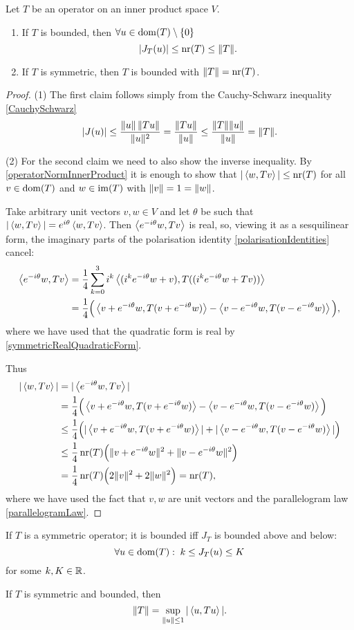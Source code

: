 \begin{proposition} \label{normNumRadius}
Let $T$ be an operator on an inner product space $V$.
\begin{enumerate}
\item If $T$ is bounded, then $\forall u\in \operatorname{dom}(T)\setminus\{0\}$
\[ |J_T(u)| \leq \operatorname{nr}(T) \leq \lVert T\rVert. \]
\item If $T$ is symmetric, then $T$ is bounded with $\lVert T\rVert = \operatorname{nr}(T)$.
\end{enumerate}
\end{proposition}
\begin{proof}
(1) The first claim follows simply from the Cauchy-Schwarz inequality \ref{CauchySchwarz}
\[ |J(u)| \leq \frac{\lVert u\rVert\,\lVert Tu\rVert}{\lVert u\rVert^2} = \frac{\lVert Tu\rVert}{\lVert u\rVert} \leq \frac{\lVert T\rVert\lVert u\rVert}{\lVert u\rVert} = \lVert T\rVert. \]

(2) For the second claim we need to also show the inverse inequality. By \ref{operatorNormInnerProduct} it is enough to show that $|\left\langle w,Tv \right\rangle| \leq \operatorname{nr}(T)$ for all $v\in \operatorname{dom}(T)$ and $w\in\operatorname{im}(T)$ with $\lVert v\rVert = 1 = \lVert w\rVert$.

Take arbitrary unit vectors $v,w\in V$ and let $\theta$ be such that $|\left\langle w,Tv \right\rangle| = e^{i\theta}\left\langle w,Tv \right\rangle$. Then $\left\langle e^{-i\theta}w,Tv \right\rangle$ is real, so, viewing it as a sesquilinear form, the imaginary parts of the polarisation identity \ref{polarisationIdentities} cancel:
\begin{align*}
\left\langle e^{-i\theta}w,Tv \right\rangle &= \frac{1}{4}\sum_{k=0}^3i^k \left\langle (i^ke^{-i\theta}w + v), T((i^ke^{-i\theta}w + Tv)) \right\rangle \\
&= \frac{1}{4}\Big( \left\langle v+e^{-i\theta}w, T(v+e^{-i\theta}w) \right\rangle - \left\langle v-e^{-i\theta}w, T(v-e^{-i\theta}w) \right\rangle \Big),
\end{align*}
where we have used that the quadratic form is real by \ref{symmetricRealQuadraticForm}.

Thus
\begin{align*}
|\left\langle w,Tv \right\rangle| &= |\left\langle e^{-i\theta}w,Tv \right\rangle| \\
&= \frac{1}{4}\Big(\left\langle v+e^{-i\theta}w, T(v+e^{-i\theta}w) \right\rangle - \left\langle v-e^{-i\theta}w, T(v-e^{-i\theta}w) \right\rangle \Big) \\
&\leq \frac{1}{4}\Big( |\left\langle v+e^{-i\theta}w, T(v+e^{-i\theta}w) \right\rangle| + |\left\langle v-e^{-i\theta}w, T(v-e^{-i\theta}w) \right\rangle| \Big) \\
&\leq \frac{1}{4}\operatorname{nr}(T)\Big( \lVert v+e^{-i\theta}w\rVert^2 + \lVert v-e^{-i\theta}w\rVert^2 \Big) \\
&= \frac{1}{4}\operatorname{nr}(T)\Big( 2\lVert v\rVert^2 + 2\lVert w\rVert^2 \Big) = \operatorname{nr}(T),
\end{align*}
where we have used the fact that $v,w$ are unit vectors and the parallelogram law \ref{parallelogramLaw}.
\end{proof}
\begin{corollary}
If $T$ is a symmetric operator; it is bounded iff $J_T$ is bounded above and below:
\[ \forall u\in\operatorname{dom}(T): \; k \leq J_T(u) \leq K \]
for some $k,K\in \mathbb{R}$.
\end{corollary}
\begin{corollary}
If $T$ is symmetric and bounded, then
\[ \lVert T\rVert = \sup_{\lVert u\rVert\leq 1} |\left\langle u,Tu \right\rangle|. \]
\end{corollary}


